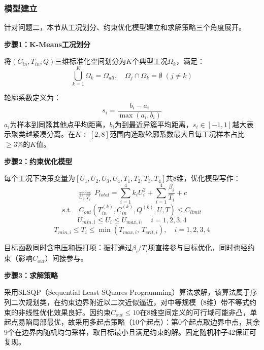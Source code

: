 
\subsubsection{模型建立}

针对问题二，本节从工况划分、约束优化模型建立和求解策略三个角度展开。

\textbf{步骤1：K-Means工况划分}

将$(C_{in},T_{in},Q)$三维标准化空间划分为$K$个典型工况$\Omega_k$，满足：
\begin{equation}
    \bigcup_{k=1}^{K} \Omega_k = \Omega_{all},\quad \Omega_j \cap \Omega_k = \emptyset\;(j\neq k)
\end{equation}

轮廓系数定义为：
\begin{equation}
    s_i = \frac{b_i - a_i}{\max(a_i, b_i)}
\end{equation}
$a_i$为样本到同簇其他点平均距离，$b_i$为到最近异簇平均距离，$s_i\in[-1,1]$越大表示聚类越紧凑分离。在$K\in[2,8]$范围内选取轮廓系数最大且每工况样本占比$\geq 3\%$的$K$值。

\textbf{步骤2：约束优化模型}

每个工况下决策变量为$[U_1,U_2,U_3,U_4,T_1,T_2,T_3,T_4]$共8维，优化模型写作：
\begin{equation}
    \min_{U_i,T_i}\ P_{total} = \sum_{i=1}^{4} k_i U_i^2 + \sum_{i=1}^{4} \frac{\beta_i}{T_i} + c
\end{equation}
\begin{equation}
    \text{s.t.}\quad C_{out}(T_{in}^{(k)},C_{in}^{(k)},Q^{(k)},U,T) \leq C_{limit}
\end{equation}
\begin{equation}
    U_{min,i} \leq U_i \leq U_{max,i},\quad i=1,2,3,4
\end{equation}
\begin{equation}
    T_{min,i} \leq T_i \leq \min(T_{max,i},\,T_{crit,i}),\quad i=1,2,3,4
\end{equation}

目标函数同时含电压和振打项：振打通过$\beta_i/T_i$项直接参与目标优化，同时也经约束（影响$C_{out}$）间接参与。

\textbf{步骤3：求解策略}

采用SLSQP（Sequential Least SQuares Programming）算法\cite{nocedal2006}求解，该算法属于序列二次规划类，在约束边界附近以二次近似逼近，对中等规模（8维）带不等式约束的非线性优化效果良好。因约束$C_{out}\leq 10$在8维空间定义的可行域可能非凸，单起点易陷局部最优，故采用多起点策略（10个起点）：第0个起点取边界中点，其余9个在边界内随机均匀采样，取目标最小且满足约束的解。固定随机种子42保证可复现。

